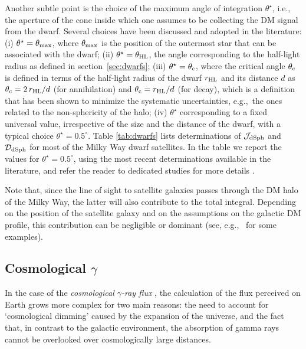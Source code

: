 Another subtle point is the choice of the maximum angle of integration $\theta^\star$, i.e., the aperture of the cone inside which one assumes to be collecting the DM signal from the dwarf. Several choices have been discussed and adopted in the literature: 
(i) $\theta^\star = \theta_{\rm max}$, where $\theta_{\rm max}$ is the position of the outermost star that can be associated with the dwarf; 
(ii) $\theta^\star = \theta_{\rm HL}$, the angle corresponding to the half-light radius as defined in section~\ref{sec:dwarfs}; 
(iii) $\theta^\star = \theta_{\rm c}$, where the critical angle $\theta_{\rm c}$ is defined in terms of the half-light radius of the dwarf $r_{\rm HL}$ and its distance $d$ as $\theta_{\rm c} = 2 \, r_{\rm HL}/d$ (for annihilation) and $\theta_{\rm c} = r_{\rm HL}/d$ (for decay), which is a definition that has been shown to 
minimize the systematic uncertainties, e.g.,~the ones related to the non-sphericity of the halo; 
(iv) $\theta^\star$ corresponding to a fixed universal value, irrespective of the size and the distance of the dwarf, with a typical choice $\theta^\star = 0.5^\circ$. 
Table \ref{tab:dwarfs} lists determinations of ${\mathcal J}_{\rm dSph}$ and ${\mathcal D}_{\rm dSph}$ for most of the Milky Way dwarf satellites. 
In the table 
we report the values for $\theta^\star =0.5^\circ$, using the most recent determinations available in the literature, and refer the reader to dedicated studies for more details \cite{Jdwarfs}. 

Note that, since the line of sight to satellite galaxies passes through the DM halo of the Milky Way, the latter will also contribute to the total integral. Depending on the position of the satellite galaxy and on the assumptions on the galactic DM profile, this contribution can be negligible or dominant (see, e.g.,~ \cite{Jdwarfs} for some examples). 



\subsection{Cosmological $\gamma$}
\label{sec:cosmogammas}

In the case of the {\em cosmological $\gamma$-ray flux} \cite{cosmogammas}, the calculation of the flux perceived on Earth grows more complex for two main reasons: the need to account for `cosmological dimming' caused by the expansion of the universe, and the fact that, in contrast to the galactic environment, the absorption of gamma rays cannot be overlooked over cosmologically large distances.

